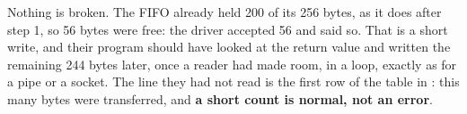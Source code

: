  Nothing is broken. The FIFO already held 200 of its 256 bytes, as it does after step 1,
so 56 bytes were free: the driver accepted 56 and said so. That is a short write, and their program
should have looked at the return value and written the remaining 244 bytes later, once a reader had
made room, in a loop, exactly as for a pipe or a socket. The line they had not read is the first row
of the table in : this many bytes were transferred, and \textbf{a
short count is normal, not an error}.
